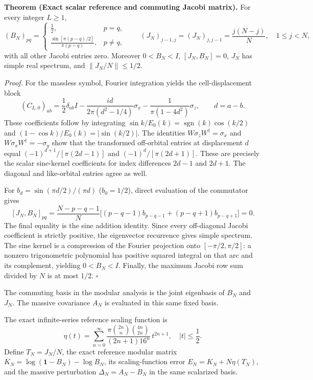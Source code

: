 \documentclass[
  10pt,
  a4paper,
]{article}
\begin{document}
\textbf{Theorem (Exact scalar reference and commuting Jacobi matrix).} For every integer \(L\ge1\), \begin{equation}
\label{eq:ref}
(B_N)_{pq}=\begin{cases}\frac12,&p=q,\\[2pt] \frac{\sin[\pi(p-q)/2]}{\pi(p-q)},&p\ne q,\end{cases}\qquad
(J_N)_{j-1,j}=(J_N)_{j,j-1}=\frac{j(N-j)}N,\quad 1\le j<N,
\end{equation} with all other Jacobi entries zero. Moreover \(0<B_N<I\), \([J_N,B_N]=0\), \(J_N\) has simple real spectrum, and \(\lVert J_N/N\rVert\le1/2\).

\emph{Proof.} For the massless symbol, Fourier integration yields the cell-displacement block \[
(C_{L,0})_{ab}=\frac12\delta_{ab}I
-\frac{id}{2\pi(d^2-1/4)}\sigma_x
-\frac1{\pi(1-4d^2)}\sigma_z,\qquad d=a-b.
\] These coefficients follow by integrating \(\sin k/E_0(k)=\operatorname{sgn}(k)\cos(k/2)\) and \((1-\cos k)/E_0(k)=|\sin(k/2)|\). The identities \(W\sigma_zW^\dagger=\sigma_x\) and \(W\sigma_xW^\dagger=-\sigma_y\) show that the transformed off-orbital entries at displacement \(d\) equal \((-1)^{d+1}/[\pi(2d-1)]\) and \((-1)^d/[\pi(2d+1)]\). These are precisely the scalar sine-kernel coefficients for index differences \(2d-1\) and \(2d+1\). The diagonal and like-orbital entries agree as well.

For \(b_d=\sin(\pi d/2)/(\pi d)\) (\(b_0=1/2\)), direct evaluation of the commutator gives \[
[J_N,B_N]_{pq}=\frac{N-p-q-1}{N}
\big[(p-q-1)b_{p-q-1}+(p-q+1)b_{p-q+1}\big]=0.
\] The final equality is the sine addition identity. Since every off-diagonal Jacobi coefficient is strictly positive, the eigenvector recurrence gives simple spectrum. The sine kernel is a compression of the Fourier projection onto \([-\pi/2,\pi/2]\): a nonzero trigonometric polynomial has positive squared integral on that arc and its complement, yielding \(0<B_N<I\). Finally, the maximum Jacobi row sum divided by \(N\) is at most \(1/2\). \(\square\)

The commuting basis in the modular analysis is the joint eigenbasis of \(B_N\) and \(J_N\). The massive covariance \(A_N\) is evaluated in this same fixed basis.

The exact infinite-series reference scaling function is \begin{equation}
\label{eq:eta}
\eta(t)=\sum_{n=0}^{\infty}
\frac{\pi\binom{2n}{n}\binom{4n}{2n}}{(2n+1)16^n}\,t^{2n+1},\quad |t|\le\frac12.
\end{equation} Define \(T_N=J_N/N\), the exact reference modular matrix \(K_N=\log(\mathbf 1-B_N)-\log B_N\), its scaling-function error \(E_N=K_N+N\eta(T_N)\), and the massive perturbation \(\Delta_N=A_N-B_N\) in the same scalarized basis.
\end{document}
